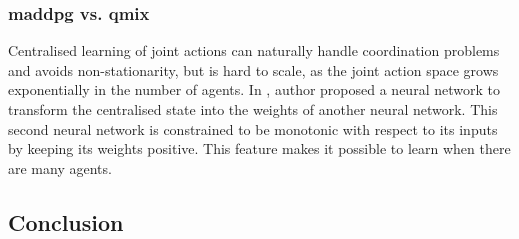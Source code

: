 \subsubsection{\gls{maddpg} vs. \gls{qmix}}
Centralised learning of joint actions can naturally handle coordination problems and avoids non-stationarity, but is hard to scale, as the joint action space grows exponentially in the number of agents. In \parencite{Rashid2018}, author proposed a neural network to transform the centralised state into the weights of another neural network. This second neural network is constrained to be monotonic with respect to its inputs by keeping its weights positive. This feature makes it possible to learn when there are many agents.

\subsection{Conclusion}
